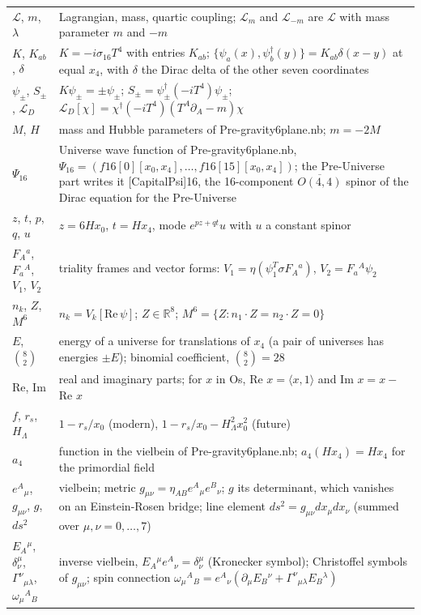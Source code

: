 \documentclass[10pt]{article}
\begin{document}
{\begin{longtable}{>{\raggedright\arraybackslash}p{}>{\raggedright\arraybackslash}p{}}
$\mathcal L$, $m$, $\lambda$ & Lagrangian, mass, quartic coupling; $\mathcal L_m$ and $\mathcal L_{-m}$ are $\mathcal L$ with mass parameter $m$ and $-m$ \\
$K$, $K_{ab}$, $\delta$ & $K = -i\sigma_{16}T^4$ with entries $K_{ab}$; $\{\psi_a(x),\psi_b^\dagger(y)\} = K_{ab}\delta(x-y)$ at equal $x_4$, with $\delta$ the Dirac delta of the other seven coordinates \\
$\psi_\pm$, $S_\pm$, $\mathcal L_D$ & $K\psi_\pm = \pm\psi_\pm$; $S_\pm = \psi_\pm^\dagger(-iT^4)\psi_\pm$; $\mathcal L_D[\chi] = \chi^\dagger(-iT^4)(T^A\partial_A - m)\chi$ \\
$M$, $H$ & mass and Hubble parameters of Pre-gravity6plane.nb; $m = -2M$ \\
$\Psi_{16}$ & Universe wave function of Pre-gravity6plane.nb, $\Psi_{16} = (f16[0][x_0,x_4], \dots, f16[15][x_0,x_4])$; the Pre-Universe part writes it [CapitalPsi]16, the 16-component $\overline{O(4,4)}$ spinor of the Dirac equation for the Pre-Universe \\
$z$, $t$, $p$, $q$, $u$ & $z = 6Hx_0$, $t = Hx_4$, mode $e^{pz+qt}u$ with $u$ a constant spinor \\
$F_A{}^a$, $F_a{}^A$, $V_1$, $V_2$ & triality frames and vector forms: $V_1 = \eta(\psi_1^T\sigma F_A{}^a)$, $V_2 = F_a{}^A\psi_2$ \\
$n_k$, $Z$, $M^6$ & $n_k = V_k[\mathrm{Re}\,\psi]$; $Z\in\mathbb R^8$; $M^6 = \{Z : n_1\cdot Z = n_2\cdot Z = 0\}$ \\
$E$, $\binom82$ & energy of a universe for translations of $x_4$ (a pair of universes has energies $\pm E$); binomial coefficient, $\binom82 = 28$ \\
Re, Im & real and imaginary parts; for $x$ in Os, Re $x = \langle x,1\rangle$ and Im $x = x -$ Re $x$ \\
$f$, $r_s$, $H_\Lambda$ & $1-r_s/x_0$ (modern), $1-r_s/x_0-H_\Lambda^2x_0^2$ (future) \\
$a_4$ & function in the vielbein of Pre-gravity6plane.nb; $a_4(Hx_4) = Hx_4$ for the primordial field \\
$e^A{}_\mu$, $g_{\mu\nu}$, $g$, $ds^2$ & vielbein; metric $g_{\mu\nu} = \eta_{AB}e^A{}_\mu e^B{}_\nu$; $g$ its determinant, which vanishes on an Einstein-Rosen bridge; line element $ds^2 = g_{\mu\nu}dx_\mu dx_\nu$ (summed over $\mu, \nu = 0, \dots, 7$) \\
$E_A{}^\mu$, $\delta^\mu_\nu$, $\Gamma^\nu{}_{\mu\lambda}$, $\omega_\mu{}^A{}_B$ & inverse vielbein, $E_A{}^\mu e^A{}_\nu = \delta^\mu_\nu$ (Kronecker symbol); Christoffel symbols of $g_{\mu\nu}$; spin connection $\omega_\mu{}^A{}_B = e^A{}_\nu(\partial_\mu E_B{}^\nu + \Gamma^\nu{}_{\mu\lambda}E_B{}^\lambda)$ \\

\end{longtable}}
\end{document}
